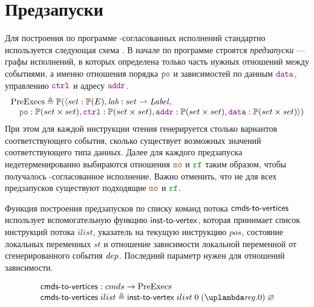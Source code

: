 \section{Предзапуски}
\label{app:comptopreexec}

Для построения по программе \ARM-согласованных исполнений стандартно
используется следующая схема \cite{Vafeiadis-Narayan:OOPSLA13}.
В начале по программе строятся \emph{предзапуски} --- графы исполнений, в которых определена
только часть нужных отношений между событиями, а именно отношения порядка $\lPO$ и зависимостей
по данным $\lDATA$, управлению $\lCTRL$ и адресу $\lADDR$.
\[
\inarr{
  \PreExecutions \defeq \Pset(\langle set : \Pset(E), \lab : set \rightharpoonup \Label, \\
   \quad \lPO : \Pset(set \times set), \lCTRL : \Pset(set \times set),
         \lADDR : \Pset(set \times set), \lDATA : \Pset(set \times set) \rangle) \\
}\]
При этом для каждой инструкции чтения
генерируется столько вариантов соответствующего события, сколько существует возможных значений
соответствующего типа данных.
Далее для каждого предзапуска недетерменированно выбираются отношения $\lCO$ и $\lRF$
таким образом, чтобы получалось \ARM-согласованное исполнение. Важно отменить, что не для всех предзапусков
существуют подходящие $\lCO$ и $\lRF$.

Функция построения предзапусков по списку команд потока $\textup{\sf cmds-to-vertices}$ использует вспомогательную функцию $\textup{\sf inst-to-vertex}$,
которая принимает список инструкций потока $ilist$, указатель на текущую инструкцию $pos$,
состояние локальных переменных $st$ и отношение зависимости локальной переменной от сгенерированного события $\mathit{dep}$.
Последний параметр нужен для отношений зависимости.

\[
\inarr{
  \cmdsToVrtxs : \Carm \rightarrow \PreExecutions \\
  \cmdsToVrtxs \; ilist \defeq \instToVrtx \; ilist \; 0 \; (\lambda \reg. 0) \; \emptyset \\
}\]


